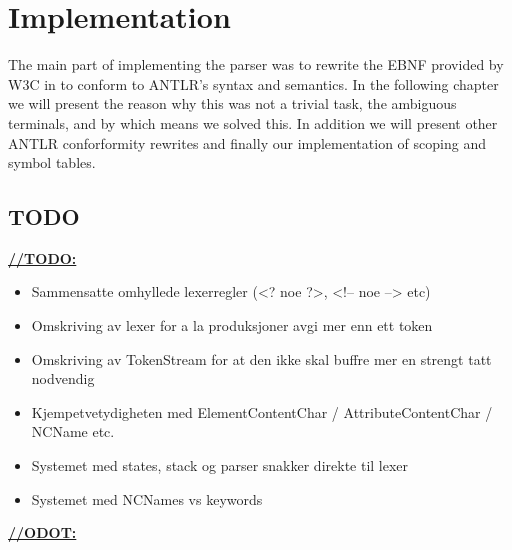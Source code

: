\chapter{Implementation}

The main part of implementing the parser was to rewrite the EBNF provided by W3C in \cite{w3c01} to conform to ANTLR's syntax and semantics. In the following chapter we will present the reason why this was not a trivial task, the ambiguous terminals, and by which means we solved this. In addition we will present other ANTLR conforformity rewrites and finally our implementation of scoping and symbol tables.





\section{TODO}

\underline{\textbf{\LARGE //TODO:}}
\begin{itemize}
\item Sammensatte omhyllede lexerregler (<? noe ?>, <!-- noe --> etc)
\item Omskriving av lexer for a la produksjoner avgi mer enn ett token
\item Omskriving av TokenStream for at den ikke skal buffre mer en strengt tatt nodvendig
\item Kjempetvetydigheten med ElementContentChar / AttributeContentChar / NCName etc.
\item Systemet med states, stack og parser snakker direkte til lexer
\item Systemet med NCNames vs keywords
\end{itemize}

\underline{\textbf{\LARGE //ODOT:}}